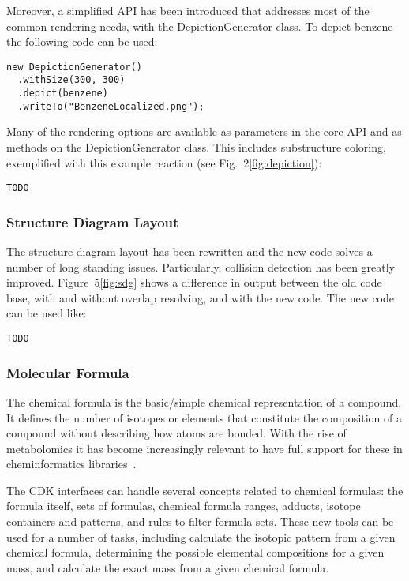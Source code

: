 \documentclass[10pt]{bmcart}
\begin{document}
  
  Moreover, a simplified API has been introduced that addresses most of the
  common rendering needs, with the DepictionGenerator class. To depict benzene
  the following code can be used:

\begin{verbatim}
new DepictionGenerator()
  .withSize(300, 300)
  .depict(benzene)
  .writeTo("BenzeneLocalized.png");
\end{verbatim}

  Many of the rendering options are available as parameters in the core API
  and as methods on the DepictionGenerator class. This includes substructure
  coloring, exemplified with this example reaction (see Fig.~2\ref{fig:depiction}):

\begin{verbatim}
TODO
\end{verbatim}

  \subsubsection*{Structure Diagram Layout}

  The structure diagram layout has been rewritten and the new code solves a
  number of long standing issues. Particularly, collision detection has been
  greatly improved. Figure~5\ref{fig:sdg} shows a difference in output between
  the old code base, with and without overlap resolving, and with the new code.
  The new code can be used like:

\begin{verbatim}
TODO
\end{verbatim}

  \subsubsection*{Molecular Formula}

The chemical formula is the basic/simple chemical representation of a compound.
It defines the number of isotopes or elements that constitute the composition
of a compound without describing how atoms are bonded. With the rise of
metabolomics it has become increasingly relevant to have full support for these
in cheminformatics libraries~\cite{RojasCherto2011}.

The CDK interfaces can handle several concepts related to chemical formulas:
the formula itself, sets of formulas, chemical formula ranges, adducts,
isotope containers and patterns, and rules to filter formula sets. These new
tools can be used for a number of tasks, including calculate the isotopic
pattern from a given chemical formula, determining the possible elemental
compositions for a given mass, and calculate the exact mass from a given
chemical formula.
\end{document}

